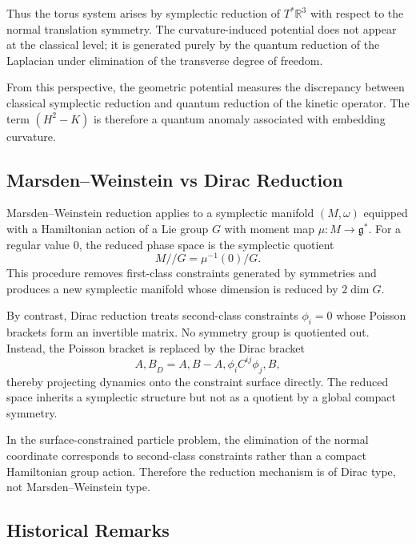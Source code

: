 Thus the torus system arises by symplectic reduction of $T^*\mathbb{R}^3$ with
respect to the normal translation symmetry. The curvature-induced potential does
not appear at the classical level; it is generated purely by the quantum 
reduction of the Laplacian under elimination of the transverse degree of freedom.

From this perspective, the geometric potential measures the discrepancy between
classical symplectic reduction and quantum reduction of the kinetic operator. 
The term $(H^2-K)$ is therefore a quantum anomaly associated with embedding 
curvature.

\subsection*{Marsden--Weinstein vs Dirac Reduction}

Marsden--Weinstein reduction applies to a symplectic manifold $(M,\omega)$ 
equipped with a Hamiltonian action of a Lie group $G$ with moment map 
$\mu: M \to \mathfrak{g}^*$. For a regular value $0$, the reduced phase 
space is the symplectic quotient
\begin{equation}
M//G = \mu^{-1}(0)/G.
\end{equation}
This procedure removes first-class constraints generated by symmetries 
and produces a new symplectic manifold whose dimension is reduced by $2\dim G$.

By contrast, Dirac reduction treats second-class constraints $\phi_i=0$ 
whose Poisson brackets form an invertible matrix. No symmetry group is 
quotiented out. Instead, the Poisson bracket is replaced by the Dirac bracket
\begin{equation}
{A,B}_D = {A,B} - {A,\phi_i}C^{ij}{\phi_j,B},
\end{equation}
thereby projecting dynamics onto the constraint surface directly. The reduced 
space inherits a symplectic structure but not as a quotient by a 
global compact symmetry.

In the surface-constrained particle problem, the elimination of the normal 
coordinate corresponds to second-class constraints rather than a compact 
Hamiltonian group action. Therefore the reduction mechanism is of Dirac type, 
not Marsden--Weinstein type.

\subsection*{Historical Remarks}

